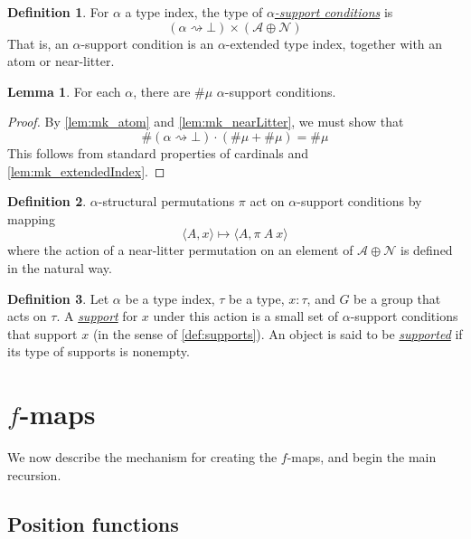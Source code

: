\documentclass{article}
\newcommand{\cdef}[3]{\href{https://leanprover-community.github.io/con-nf/doc/ConNF/#1.html\#ConNF.#2}{\emph{#3}}}
\theoremstyle{definition}
\newtheorem{definition}{Definition}[section]
\newtheorem{lemma}[theorem]{Lemma}
\theoremstyle{remark}
\begin{document}
\begin{definition}
    For \( \alpha \) a type index, the type of \cdef{Structural/Support}{SupportCondition}{\( \alpha \)-support conditions} is
    \[ (\alpha \rightsquigarrow \bot) \times (\mathcal A \oplus \mathcal N) \]
    That is, an \( \alpha \)-support condition is an \( \alpha \)-extended type index, together with an atom or near-litter.
\end{definition}
\begin{lemma}
    \label{lem:mk_supportCondition}
    For each \( \alpha \), there are \( \#\mu \) \( \alpha \)-support conditions.
\end{lemma}
\begin{proof}
    By \cref{lem:mk_atom} and \cref{lem:mk_nearLitter}, we must show that
    \[ \#(\alpha \rightsquigarrow \bot) \cdot (\#\mu + \#\mu) = \#\mu \]
    This follows from standard properties of cardinals and \cref{lem:mk_extendedIndex}.
\end{proof}
\begin{definition}
    \( \alpha \)-structural permutations \( \pi \) act on \( \alpha \)-support conditions by mapping
    \[ \langle A, x \rangle \mapsto \langle A, \pi\ A\ x \rangle \]
    where the action of a near-litter permutation on an element of \( \mathcal A \oplus \mathcal N \) is defined in the natural way.
\end{definition}
\begin{definition}
    Let \( \alpha \) be a type index, \( \tau \) be a type, \( x : \tau \), and \( G \) be a group that acts on \( \tau \).
    A \cdef{Structural/Support}{Support}{support} for \( x \) under this action is a small set of \( \alpha \)-support conditions that support \( x \) (in the sense of \cref{def:supports}).
    An object is said to be \cdef{Structural/Support}{Supported}{supported} if its type of supports is nonempty.
\end{definition}

\section{\texorpdfstring{\( f \)}{f}-maps}

We now describe the mechanism for creating the \( f \)-maps, and begin the main recursion.

\subsection{Position functions}
\end{document}
